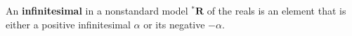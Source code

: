 An \textbf{infinitesimal} in a nonstandard model ${^*\mathbf{R}}$ of the reals is an element that is either a positive infinitesimal $\alpha$ or its negative $-\alpha$.
